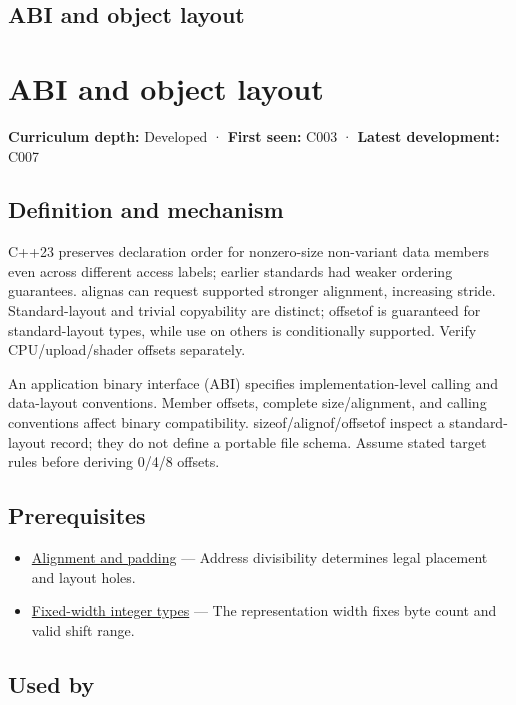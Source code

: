 \hypertarget{appendix-c4ac6bb0fff8}{}
\section*{ABI and object layout}
\chapter{ABI and object layout}\label{appendix-c4ac6bb0fff8-abi-and-object-layout}

\textbf{Curriculum depth:} Developed · \textbf{First seen:} C003 · \textbf{Latest development:} C007

\section{Definition and mechanism}\label{appendix-c4ac6bb0fff8-definition-and-mechanism}

C++23 preserves declaration order for nonzero-size non-variant data members even across different access labels; earlier standards had weaker ordering guarantees. alignas can request supported stronger alignment, increasing stride. Standard-layout and trivial copyability are distinct; offsetof is guaranteed for standard-layout types, while use on others is conditionally supported. Verify CPU/upload/shader offsets separately.

An application binary interface (ABI) specifies implementation-level calling and data-layout conventions. Member offsets, complete size/alignment, and calling conventions affect binary compatibility. sizeof/alignof/offsetof inspect a standard-layout record; they do not define a portable file schema. Assume stated target rules before deriving 0/4/8 offsets.

\section{Prerequisites}\label{appendix-c4ac6bb0fff8-prerequisites}

\begin{itemize}
\tightlist
\item
  \hyperref[appendix-a1f7c53b4742]{Alignment and padding} --- Address divisibility determines legal placement and layout holes.
\item
  \hyperref[appendix-cc04044b5782]{Fixed-width integer types} --- The representation width fixes byte count and valid shift range.
\end{itemize}

\section{Used by}\label{appendix-c4ac6bb0fff8-used-by}

